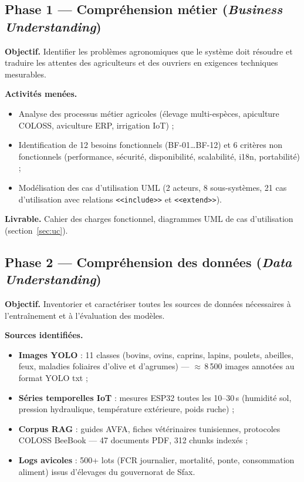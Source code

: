 \subsection*{Phase 1 --- Compréhension métier (\textit{Business Understanding})}

\textbf{Objectif.} Identifier les problèmes agronomiques que le système doit
résoudre et traduire les attentes des agriculteurs et des ouvriers en exigences
techniques mesurables.

\textbf{Activités menées.}
\begin{itemize}
  \item Analyse des processus métier agricoles (élevage multi-espèces,
        apiculture COLOSS, aviculture ERP, irrigation IoT) ;
  \item Identification de 12 besoins fonctionnels (BF-01\ldots BF-12) et
        6 critères non fonctionnels (performance, sécurité, disponibilité,
        scalabilité, i18n, portabilité) ;
  \item Modélisation des cas d'utilisation UML (2 acteurs, 8 sous-systèmes,
        21 cas d'utilisation avec relations \texttt{<<include>>} et
        \texttt{<<extend>>}).
\end{itemize}

\textbf{Livrable.} Cahier des charges fonctionnel, diagrammes UML de cas
d'utilisation (section~\ref{sec:uc}).

\subsection*{Phase 2 --- Compréhension des données (\textit{Data Understanding})}

\textbf{Objectif.} Inventorier et caractériser toutes les sources de données
nécessaires à l'entraînement et à l'évaluation des modèles.

\textbf{Sources identifiées.}
\begin{itemize}
  \item \textbf{Images YOLO} : 11 classes (bovins, ovins, caprins, lapins, poulets,
        abeilles, feux, maladies foliaires d'olive et d'agrumes) ---
        $\approx$\,8\,500 images annotées au format YOLO txt ;
  \item \textbf{Séries temporelles IoT} : mesures ESP32 toutes les 10--30\,s
        (humidité sol, pression hydraulique, température extérieure, poids ruche) ;
  \item \textbf{Corpus RAG} : guides AVFA, fiches vétérinaires tunisiennes,
        protocoles COLOSS BeeBook --- 47 documents PDF, 312 chunks indexés ;
  \item \textbf{Logs avicoles} : 500+ lots (FCR journalier, mortalité, ponte,
        consommation aliment) issus d'élevages du gouvernorat de Sfax.
\end{itemize}


